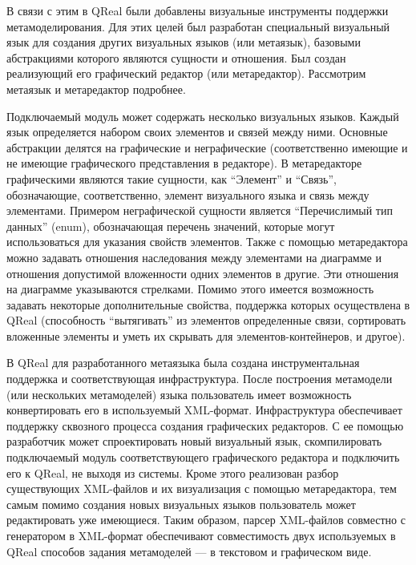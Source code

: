 \documentclass[a4paper]{article}
\begin{document}
В связи с этим в QReal были добавлены визуальные инструменты поддержки метамоделирования. Для этих целей был разработан специальный визуальный язык для создания других визуальных языков (или метаязык), базовыми абстракциями которого являются сущности и отношения. Был создан реализующий его графический редактор (или метаредактор). Рассмотрим метаязык и метаредактор подробнее. 

Подключаемый модуль может содержать несколько визуальных языков. Каждый язык определяется набором своих элементов и связей между ними. Основные абстракции делятся на графические и неграфические (соответственно имеющие и не имеющие графического представления в редакторе). В метаредакторе графическими являются такие сущности, как ``Элемент''  и ``Связь'', обозначающие, соответственно, элемент визуального языка и связь между элементами. Примером неграфической сущности является ``Перечислимый тип данных'' (enum), обозначающая перечень значений, которые могут использоваться для указания свойств элементов. Также с помощью метаредактора можно задавать отношения наследования между элементами на диаграмме и отношения допустимой вложенности одних элементов в другие. Эти отношения на диаграмме указываются стрелками. Помимо этого имеется возможность задавать некоторые дополнительные свойства, поддержка которых осуществлена в QReal (способность “вытягивать” из элементов определенные связи, сортировать вложенные элементы и уметь их скрывать для элементов-контейнеров, и другое). 

В QReal для разработанного метаязыка была создана инструментальная поддержка и соответствующая инфраструктура. После построения метамодели (или нескольких метамоделей) языка пользователь имеет возможность конвертировать его в используемый XML-формат. Инфраструктура обеспечивает поддержку сквозного процесса создания графических редакторов. С ее помощью разработчик может спроектировать новый визуальный язык, скомпилировать подключаемый модуль соответствующего графического редактора и подключить его к QReal, не выходя из системы. Кроме этого реализован разбор существующих XML-файлов и их визуализация с помощью метаредактора, тем самым помимо создания новых визуальных языков пользователь может редактировать уже имеющиеся. Таким образом, парсер XML-файлов совместно с генератором в XML-формат обеспечивают совместимость двух используемых в QReal способов задания метамоделей --- в текстовом и графическом виде.
\end{document}
